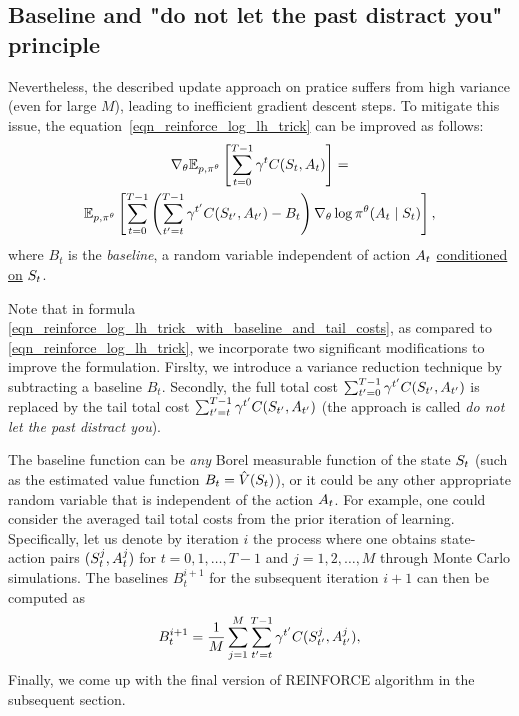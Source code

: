 \documentclass[12pt,twoside]{../../mitthesis}
\begin{document}
\subsection*{Baseline and "do not let the past distract you" principle}
Nevertheless, the described update approach on pratice suffers from high variance (even for large $M$), leading to inefficient gradient descent steps. 
To mitigate this issue, the equation~\eqref{eqn_reinforce_log_lh_trick} can be improved as follows:
\begin{multline}
    \label{eqn_reinforce_log_lh_trick_with_baseline_and_tail_costs}
    \nabla_{\theta} \E[\transit, \policy^{\theta}]{\sum_{t = 0}^{T-1} \gamma ^ t \Cost(\State_{t}, \Action_{t})} = \\ \E[\transit, \policy^{\theta}]{ \sum_{t = 0}^{T-1} \left( \sum_{t' = t}^{T-1} \gamma ^ {t'} \Cost(\State_{t'}, \Action_{t'}) - B_t \right) \nabla_{\theta}\log \policy^{\theta}(\Action_t \mid \State_t)},
\end{multline}
where $B_t$ is the \textit{baseline}, a random variable independent of action $A_t$ \href{https://en.wikipedia.org/wiki/Conditional_independence#Conditional_independence_of_random_vectors}{conditioned on} $S_t$. 

Note that in formula \eqref{eqn_reinforce_log_lh_trick_with_baseline_and_tail_costs}, as compared to \eqref{eqn_reinforce_log_lh_trick}, we incorporate two significant modifications to improve the formulation. 
Firslty, we introduce a variance reduction technique by subtracting a baseline $B_t$. 
Secondly, the full total cost $\sum_{t' = 0}^{T-1} \gamma ^ {t'} C(S_{t'}, A_{t'})$ is replaced by the tail total cost $\sum_{t' = t}^{T-1} \gamma ^ {t'} C(S_{t'}, A_{t'})$ (the approach is called \textit{do not let the past distract you}). 

The baseline function can be \textit{any} Borel measurable function of the state $S_t$ (such as the estimated value function $B_t = \hat{V}(S_t)$), or it could be any other appropriate random variable that is independent of the action $A_t$. 
For example, one could consider the averaged tail total costs from the prior iteration of learning. 
Specifically, let us denote by iteration $i$ the process where one obtains state-action pairs $(S_t^j, A_t^j)$ for $t = 0, 1, \ldots, T - 1$ and $j = 1, 2, \ldots, M$ through Monte Carlo simulations. 
The baselines $B_t^{i+1}$ for the subsequent iteration $i+1$ can then be computed as
$$
    B_{t}^{i + 1} = \frac{1}{M}\sum_{j = 1}^M \sum_{t' = t}^{T-1} \gamma^{t'} C(S^j_{t'}, A^j_{t'}),
$$
Finally, we come up with the final version of REINFORCE algorithm in the subsequent section. 
\end{document}

